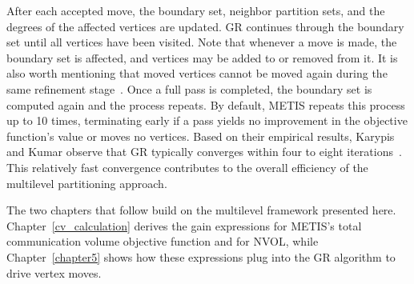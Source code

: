 After each accepted move, the boundary set, neighbor partition sets, and the degrees of the affected vertices are updated. GR continues through the boundary set until all vertices have been visited. Note that whenever a move is made, the boundary set is affected, and vertices may be added to or removed from it. It is also worth mentioning that moved vertices cannot be moved again during the same refinement stage~\cite{karypis_multilevelk-way_1998}. Once a full pass is completed, the boundary set is computed again and the process repeats. By default, METIS repeats this process up to 10 times, terminating early if a pass yields no improvement in the objective function's value or moves no vertices. Based on their empirical results, Karypis and Kumar observe that GR typically converges within four to eight iterations~\cite{karypis_multilevelk-way_1998}. This relatively fast convergence contributes to the overall efficiency of the multilevel partitioning approach. 

The two chapters that follow build on the multilevel framework presented here. Chapter~\ref{cv_calculation} derives the gain expressions for METIS's total communication volume objective function and for NVOL, while Chapter~\ref{chapter5} shows how these expressions plug into the GR algorithm to drive vertex moves.